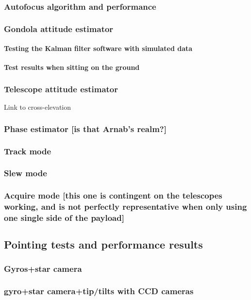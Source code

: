 \subsubsection{Autofocus algorithm and performance}
\subsubsection{	Gondola attitude estimator}
\paragraph{Testing the Kalman filter software with simulated data}
\paragraph{Test results when sitting on the ground}
\subsubsection{Telescope attitude estimator}
Link to cross-elevation
\subsubsection{Phase estimator [is that Arnab’s realm?]}
\subsubsection{Track mode}
\subsubsection{	Slew mode}
\subsubsection{	Acquire mode [this one is contingent on the telescopes working, and is not perfectly representative when only using one single side of the payload]}
\subsection{	Pointing tests and performance results}
\subsubsection{	Gyros+star camera}
\subsubsection{	gyro+star camera+tip/tilts with CCD cameras}

